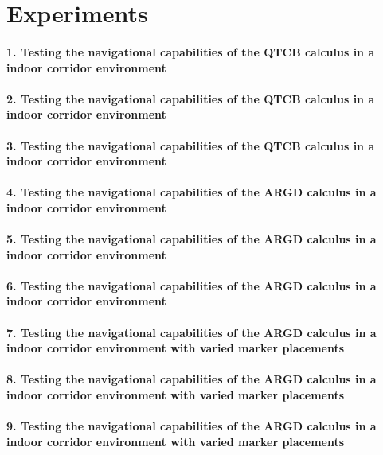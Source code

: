 \section{Experiments}
\paragraph{1. Testing the navigational capabilities of the QTCB calculus in a indoor corridor environment}
\paragraph{2. Testing the navigational capabilities of the QTCB calculus in a indoor corridor environment}
\paragraph{3. Testing the navigational capabilities of the QTCB calculus in a indoor corridor environment }
\paragraph{4. Testing the navigational capabilities of the ARGD calculus in a indoor corridor environment}
\paragraph{5. Testing the navigational capabilities of the ARGD calculus in a indoor corridor environment }
\paragraph{6. Testing the navigational capabilities of the ARGD calculus in a indoor corridor environment }
\paragraph{7. Testing the navigational capabilities of the ARGD calculus in a indoor corridor environment with varied marker placements}
\paragraph{8. Testing the navigational capabilities of the ARGD calculus in a indoor corridor environment with varied marker placements}
\paragraph{9. Testing the navigational capabilities of the ARGD calculus in a indoor corridor environment with varied marker placements}
